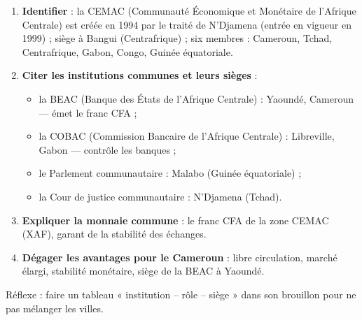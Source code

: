 \documentclass[11pt]{article}
\newcommand{\cle}[1]{{\popxbold\color{popdark}#1}}
\begin{document}
\begin{methode}
\begin{enumerate}
\item \textbf{Identifier} : la \cle{CEMAC} (Communauté Économique et Monétaire de l'Afrique Centrale) est créée en 1994 par le traité de N'Djamena (entrée en vigueur en 1999) ; siège à Bangui (Centrafrique) ; six membres : Cameroun, Tchad, Centrafrique, Gabon, Congo, Guinée équatoriale.
\item \textbf{Citer les institutions communes et leurs sièges} :
\begin{itemize}
\item la \cle{BEAC} (Banque des États de l'Afrique Centrale) : Yaoundé, Cameroun — émet le franc CFA ;
\item la \cle{COBAC} (Commission Bancaire de l'Afrique Centrale) : Libreville, Gabon — contrôle les banques ;
\item le Parlement communautaire : Malabo (Guinée équatoriale) ;
\item la Cour de justice communautaire : N'Djamena (Tchad).
\end{itemize}
\item \textbf{Expliquer la monnaie commune} : le franc CFA de la zone CEMAC (XAF), garant de la stabilité des échanges.
\item \textbf{Dégager les avantages pour le Cameroun} : libre circulation, marché élargi, stabilité monétaire, siège de la BEAC à Yaoundé.
\end{enumerate}
Réflexe : faire un tableau « institution -- rôle -- siège » dans son brouillon pour ne pas mélanger les villes.
\end{methode}
\end{document}
